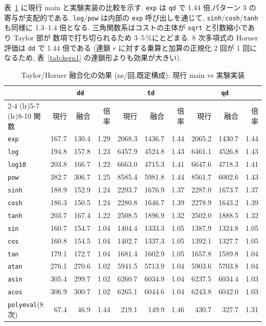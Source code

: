 \documentclass[a4paper,10pt]{ltjsarticle}
\begin{document}
表~\ref{tab:horner} に現行 main と実験実装の比較を示す.
\texttt{exp} は \texttt{qd} で 1.44 倍,パターン 3 の寄与が支配的である.
\texttt{log}/\texttt{pow} は内部の \texttt{exp} 呼び出しを通じて,
\texttt{sinh}/\texttt{cosh}/\texttt{tanh} も同様に 1.3--1.4 倍となる.
三角関数系はコストの主体が \texttt{sqrt} と引数縮小であり Taylor 部が
数項で打ち切られるため 3--5\,\%にとどまる.
8 次多項式の Horner 評価は \texttt{dd} で 1.44 倍である
(連鎖 $r$ に対する乗算と加算の正規化 2 回が 1 回になるため,
表~\ref{tab:kern1} の連鎖形よりも効果が大きい).

\begin{table}[htbp]
\centering
\caption{Taylor/Horner 融合化の効果 (ns/回,既定構成): 現行 main vs 実験実装}
\label{tab:horner}
\small
\begin{tabular}{l rrr rrr rrr}
\toprule
 & \multicolumn{3}{c}{\texttt{dd}} & \multicolumn{3}{c}{\texttt{td}} & \multicolumn{3}{c}{\texttt{qd}} \\
\cmidrule(lr){2-4} \cmidrule(lr){5-7} \cmidrule(lr){8-10}
関数 & 現行 & 融合 & 倍率 & 現行 & 融合 & 倍率 & 現行 & 融合 & 倍率 \\
\midrule
\texttt{exp} & 167.7 & 130.4 & 1.29 & 2068.3 & 1436.7 & 1.44 & 2065.2 & 1430.7 & 1.44 \\
\texttt{log} & 194.8 & 157.8 & 1.23 & 6457.9 & 4524.8 & 1.43 & 6461.1 & 4526.8 & 1.43 \\
\texttt{log10} & 203.8 & 166.7 & 1.22 & 6663.0 & 4715.3 & 1.41 & 6647.6 & 4718.3 & 1.41 \\
\texttt{pow} & 382.7 & 306.7 & 1.25 & 8585.4 & 5981.8 & 1.44 & 8561.7 & 6002.6 & 1.43 \\
\texttt{sinh} & 188.9 & 152.9 & 1.24 & 2293.7 & 1676.9 & 1.37 & 2287.0 & 1673.7 & 1.37 \\
\texttt{cosh} & 186.3 & 150.5 & 1.24 & 2280.8 & 1646.7 & 1.39 & 2278.9 & 1643.2 & 1.39 \\
\texttt{tanh} & 203.7 & 167.4 & 1.22 & 2508.5 & 1896.9 & 1.32 & 2502.0 & 1888.5 & 1.32 \\
\texttt{sin} & 160.7 & 154.7 & 1.04 & 1404.4 & 1333.3 & 1.05 & 1387.9 & 1324.8 & 1.05 \\
\texttt{cos} & 160.8 & 154.5 & 1.04 & 1402.7 & 1337.3 & 1.05 & 1392.1 & 1327.7 & 1.05 \\
\texttt{tan} & 179.1 & 172.7 & 1.04 & 1681.4 & 1602.9 & 1.05 & 1657.8 & 1589.8 & 1.04 \\
\texttt{atan} & 276.1 & 270.6 & 1.02 & 5941.5 & 5713.9 & 1.04 & 5903.6 & 5703.8 & 1.04 \\
\texttt{asin} & 305.4 & 299.7 & 1.02 & 6260.7 & 6034.9 & 1.04 & 6237.5 & 6034.4 & 1.03 \\
\texttt{acos} & 306.9 & 300.7 & 1.02 & 6265.1 & 6044.6 & 1.04 & 6243.8 & 6042.0 & 1.03 \\
\texttt{polyeval}(8次) & 67.4 & 46.9 & 1.44 & 219.1 & 149.9 & 1.46 & 430.7 & 327.7 & 1.31 \\
\bottomrule
\end{tabular}
\end{table}
\end{document}

